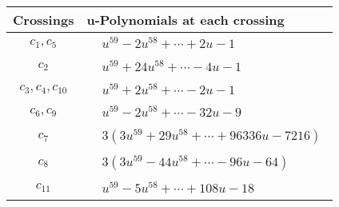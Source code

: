 \documentclass[1p]{elsarticle_modified}
\theoremstyle{definition}
\begin{document}
\begin{tabular}{m{50pt}|m{274pt}}
Crossings & \hspace{64pt}u-Polynomials at each crossing \\
\hline $$\begin{aligned}c_{1},c_{5}\end{aligned}$$&$\begin{aligned}
&u^{59}-2 u^{58}+\cdots+2 u-1
\end{aligned}$\\
\hline $$\begin{aligned}c_{2}\end{aligned}$$&$\begin{aligned}
&u^{59}+24 u^{58}+\cdots-4 u-1
\end{aligned}$\\
\hline $$\begin{aligned}c_{3},c_{4},c_{10}\end{aligned}$$&$\begin{aligned}
&u^{59}+2 u^{58}+\cdots-2 u-1
\end{aligned}$\\
\hline $$\begin{aligned}c_{6},c_{9}\end{aligned}$$&$\begin{aligned}
&u^{59}-2 u^{58}+\cdots-32 u-9
\end{aligned}$\\
\hline $$\begin{aligned}c_{7}\end{aligned}$$&$\begin{aligned}
&3(3 u^{59}+29 u^{58}+\cdots+96336 u-7216)
\end{aligned}$\\
\hline $$\begin{aligned}c_{8}\end{aligned}$$&$\begin{aligned}
&3(3 u^{59}-44 u^{58}+\cdots-96 u-64)
\end{aligned}$\\
\hline $$\begin{aligned}c_{11}\end{aligned}$$&$\begin{aligned}
&u^{59}-5 u^{58}+\cdots+108 u-18
\end{aligned}$\\
\hline
\end{tabular}\\~\\
\newpage\renewcommand{\arraystretch}{1}
\end{document}
